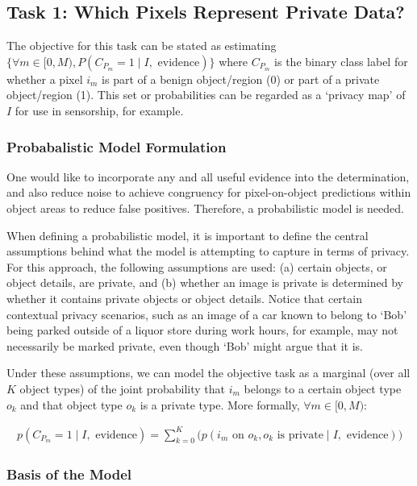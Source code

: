 \documentclass[11pt]{article}
\begin{document}
\subsection{Task 1: Which Pixels Represent Private Data?}

The objective for this task can be stated as estimating $\{\forall m \in \lbrack0,M), P(C_{P_{m}} = 1 \mid I, \textrm{ evidence}) \}$ where $C_{P_m}$ is the binary class label for whether a pixel $i_m$ is part of a benign object/region (0) or part of a private object/region (1).  This set or probabilities can be regarded as a `privacy map' of $I$ for use in sensorship, for example.

\subsubsection{Probabalistic Model Formulation}

One would like to incorporate any and all useful evidence into the determination, and also reduce noise to achieve congruency for pixel-on-object predictions within object areas to reduce false positives. Therefore, a probabilistic model is needed.

When defining a probabilistic model, it is important to define the central assumptions behind what the model is attempting to capture in terms of privacy. For this approach, the following assumptions are used: (a) certain objects, or object details, are private, and (b) whether an image is private is determined by whether it contains private objects or object details.  Notice that certain contextual privacy scenarios, such as an image of a car known to belong to `Bob' being parked outside of a liquor store during work hours, for example, may not necessarily be marked private, even though `Bob' might argue that it is.

Under these assumptions, we can model the objective task as a marginal (over all $K$ object types) of the joint probability that $i_m$ belongs to a certain object type $o_k$ and that object type $o_k$ is a private type. More formally, $\forall m \in \lbrack0,M)$:

\begin{align}\label{eqn:task1.0}
    p(C_{P_{m}} = 1 \mid I, \textrm{ evidence}) = \sum_{k = 0}^{K} \Big( p(i_m \textrm{ on } o_k, o_k \textrm{ is private} \mid I, \textrm{ evidence}) \Big)
\end{align}



\subsubsection{Basis of the Model}
\end{document}
